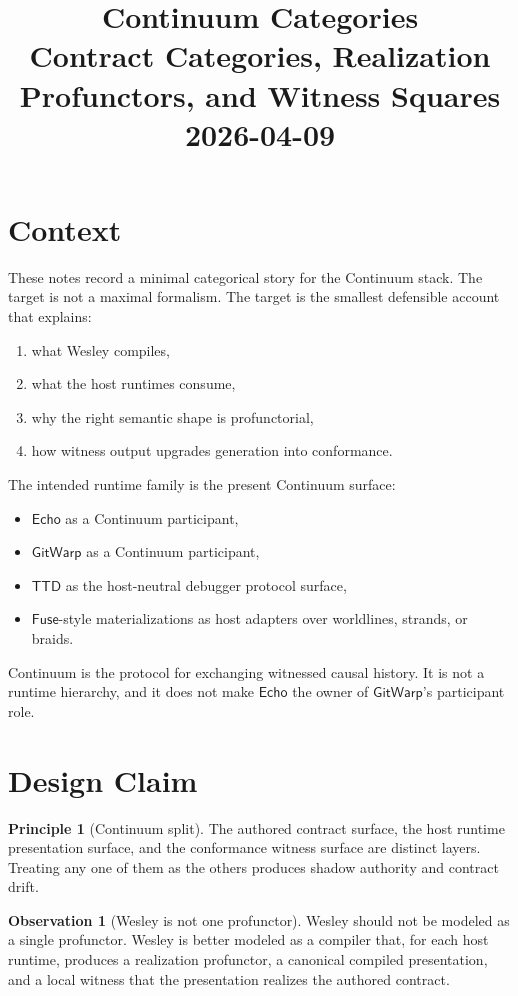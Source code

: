 \documentclass[11pt]{article}
\title{Continuum Categories\\[6pt]
\large Contract Categories, Realization Profunctors, and Witness Squares\\[3pt]
\normalsize 2026-04-09}
\author{}
\date{}
\newcommand{\TTD}{\ensuremath{\mathsf{TTD}}}
\newcommand{\Echo}{\ensuremath{\mathsf{Echo}}}
\newcommand{\GitWarp}{\ensuremath{\mathsf{GitWarp}}}
\newcommand{\Fuse}{\ensuremath{\mathsf{Fuse}}}
\theoremstyle{definition}
\newtheorem{observation}{Observation}
\newtheorem{principle}{Principle}
\begin{document}
\maketitle

\section{Context}

These notes record a minimal categorical story for the Continuum stack.
The target is not a maximal formalism. The target is the smallest
defensible account that explains:
\begin{enumerate}[leftmargin=2em]
\item what Wesley compiles,
\item what the host runtimes consume,
\item why the right semantic shape is profunctorial,
\item how witness output upgrades generation into conformance.
\end{enumerate}

The intended runtime family is the present Continuum surface:
\begin{itemize}[leftmargin=2em]
\item \Echo{} as a Continuum participant,
\item \GitWarp{} as a Continuum participant,
\item \TTD{} as the host-neutral debugger protocol surface,
\item \Fuse{}-style materializations as host adapters over worldlines, strands,
  or braids.
\end{itemize}

Continuum is the protocol for exchanging witnessed causal history. It is not a
runtime hierarchy, and it does not make \Echo{} the owner of \GitWarp{}'s
participant role.

\section{Design Claim}

\begin{principle}[Continuum split]
The authored contract surface, the host runtime presentation surface, and the
conformance witness surface are distinct layers. Treating any one of them as
the others produces shadow authority and contract drift.
\end{principle}

\begin{observation}[Wesley is not one profunctor]
Wesley should not be modeled as a single profunctor. Wesley is better modeled
as a compiler that, for each host runtime, produces a realization profunctor,
a canonical compiled presentation, and a local witness that the presentation
realizes the authored contract.
\end{observation}
\end{document}
